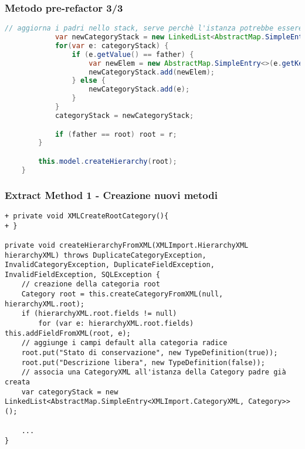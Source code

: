 \begin{frame}[fragile]
    \frametitle{Metodo pre-refactor 3/3}

    \lstset{style=tiny_java}
    \begin{lstlisting}[language=java, caption={Snippet tratto da v5, Controller.java}, firstnumber=46]
            // aggiorna i padri nello stack, serve perchè l'istanza potrebbe essere cambiata
            var newCategoryStack = new LinkedList<AbstractMap.SimpleEntry<XMLImport.CategoryXML, Category>>();
            for(var e: categoryStack) {
                if (e.getValue() == father) {
                    var newElem = new AbstractMap.SimpleEntry<>(e.getKey(), (Category) r);
                    newCategoryStack.add(newElem);
                } else {
                    newCategoryStack.add(e);
                }
            }
            categoryStack = newCategoryStack;

            if (father == root) root = r;
        }

        this.model.createHierarchy(root);
    }
    \end{lstlisting}
\end{frame}

\begin{frame}[fragile]
    \frametitle{Extract Method 1 - Creazione nuovi metodi}
    \begin{lstlisting}[language=tiny_diff]
+ private void XMLCreateRootCategory(){
+ }

private void createHierarchyFromXML(XMLImport.HierarchyXML hierarchyXML) throws DuplicateCategoryException, InvalidCategoryException, DuplicateFieldException, InvalidFieldException, SQLException {
    // creazione della categoria root
    Category root = this.createCategoryFromXML(null, hierarchyXML.root);
    if (hierarchyXML.root.fields != null)
        for (var e: hierarchyXML.root.fields) this.addFieldFromXML(root, e);
    // aggiunge i campi default alla categoria radice
    root.put("Stato di conservazione", new TypeDefinition(true));
    root.put("Descrizione libera", new TypeDefinition(false));
    // associa una CategoryXML all'istanza della Category padre già creata
    var categoryStack = new LinkedList<AbstractMap.SimpleEntry<XMLImport.CategoryXML, Category>>();

    ...
}
\end{lstlisting}
\end{frame}

